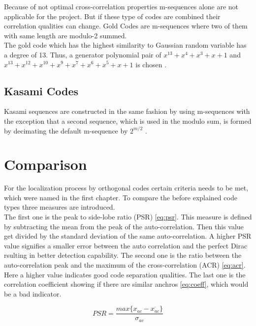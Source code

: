 Because of not optimal cross-correlation properties m-sequences alone are not applicable for the project. But if these type of codes are combined their correlation qualities can change. Gold Codes are m-sequences where two of them with same length are modulo-2 summed. \cite{proakis08} \\
The gold code which has the highest similarity to Gaussian random variable has a degree of 13. Thus, a generator polynomial pair of $x^13+x^4+x^3+x+1$ and $x^13+x^12+x^10+x^9+x^7+x^6+x^5+x+1$ is chosen \cite{merrifield} .


\subsection{Kasami Codes}

Kasami sequences are constructed in the same fashion by using m-sequences with the exception that a second sequence, which is used in the modulo sum, is formed by decimating the default m-sequence by  $2^{m/2}$ \cite{proakis08} \cite{sarwate80} \cite{peterson72}. 

\section{Comparison}

For the localization process by orthogonal codes certain criteria needs to be met, which were named in the first chapter. To compare the before explained code types three measures are introduced. \\ 
The first one is the peak to side-lobe ratio (PSR) \ref{eq:psr}. This measure is defined by subtracting the mean from the peak of the auto-correlation. Then this value get divided by the standard deviation of the same auto-correlation. A higher PSR value signifies a smaller error between the auto correlation and the perfect Dirac rsulting in better detection capability. The second one is the ratio between the auto-correlation peak and the maximum of the cross-correlation (ACR) \ref{eq:acr}. Here a higher value indicates good code separation qualities. The last one is the correlation coefficient showing if there are similar anchros \ref{eq:coeff}, which would be a bad indicator.

\begin{equation}
PSR=\dfrac{max\{x_{ac}-\overline{x_{ac}}\}}{\sigma_{ac}}
\label{eq:psr}
\end{equation}

